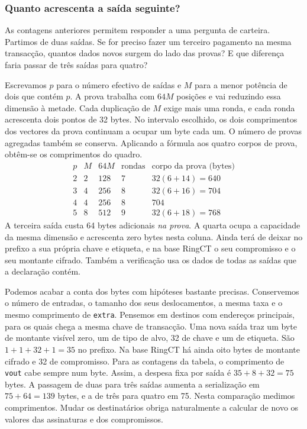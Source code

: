 \subsubsection*{Quanto acrescenta a saída seguinte?}

As contagens anteriores permitem responder a uma pergunta de carteira.
Partimos de duas saídas. Se for preciso fazer um terceiro pagamento
na mesma transacção, quantos dados novos surgem do lado das provas?
E que diferença faria passar de três saídas para quatro?

Escrevamos \(p\) para o número efectivo de saídas e \(M\) para a
menor potência de dois que contém \(p\). A prova trabalha com
\(64M\) posições e vai reduzindo essa dimensão à metade. Cada
duplicação de \(M\) exige mais uma ronda, e cada ronda acrescenta
dois pontos de 32 bytes. No intervalo escolhido, os dois comprimentos
dos vectores da prova continuam a ocupar um byte cada um. O número
de provas agregadas também se conserva. Aplicando a fórmula aos
quatro corpos de prova, obtêm-se os comprimentos do quadro.
\[
\begin{array}{r|r|r|r|r}
p&M&64M&\text{rondas}&\text{corpo da prova (bytes)}\\ \hline
2 &2&128 &7 & 32(6+14)=640\\
3 &4&256 &8 & 32(6+16)=704\\
4 &4&256 &8 & 704\\
5 &8&512 &9 & 32(6+18)=768
\end{array}
\]
A terceira saída custa 64 bytes adicionais \emph{na prova}. A
quarta ocupa a capacidade da mesma dimensão e acrescenta zero bytes
nesta coluna. Ainda terá de deixar no prefixo a sua própria chave
e etiqueta, e na base RingCT o seu compromisso e o seu montante
cifrado. Também a verificação usa os dados de todas as saídas que
a declaração contém.

Podemos acabar a conta dos bytes com hipóteses bastante precisas.
Conservemos o número de entradas, o tamanho dos seus deslocamentos,
a mesma taxa e o mesmo comprimento de \texttt{extra}. Pensemos em
destinos com endereços principais, para os quais chega a mesma
chave de transacção. Uma nova saída traz um byte de montante visível
zero, um de tipo de alvo, 32 de chave e um de etiqueta. São
\(1+1+32+1=35\) no prefixo. Na base RingCT há ainda oito bytes
de montante cifrado e 32 de compromisso. Para as contagens da
tabela, o comprimento de \texttt{vout} cabe sempre num byte.
Assim, a despesa fixa por saída é \(35+8+32=75\) bytes. A
passagem de duas para três saídas aumenta a serialização em
\(75+64=139\) bytes, e a de três para quatro em 75.
Nesta comparação medimos comprimentos. Mudar os destinatários
obriga naturalmente a calcular de novo os valores das assinaturas
e dos compromissos.

